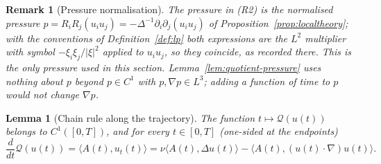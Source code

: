 \documentclass[11pt]{article}
\newtheorem{remark}[theorem]{Remark}
\newtheorem{lemma}[theorem]{Lemma}
\theoremstyle{definition}
\theoremstyle{plain}
\begin{document}
\begin{remark}[Pressure normalisation]\label{rem:qe-pressure-normalisation}
The pressure in (R2) is the normalised pressure
$p=R_iR_j(u_iu_j)=-\Delta^{-1}\partial_i\partial_j(u_iu_j)$ of
Proposition~\ref{prop:localtheory}; with the conventions of
Definition~\ref{def:lp} both expressions are the $L^2$ multiplier with
symbol $-\xi_i\xi_j/|\xi|^2$ applied to $u_iu_j$, so they coincide, as
recorded there.  This is the only pressure used in this section.
Lemma~\ref{lem:quotient-pressure} uses nothing about $p$ beyond $p\in C^1$
with $p,\nabla p\in L^3$; adding a function of time to $p$ would not change
$\nabla p$.
\end{remark}

\begin{lemma}[Chain rule along the trajectory]\label{lem:quotient-chainrule}
The function $t\mapsto\mathcal Q(u(t))$ belongs to $C^1([0,T])$, and for
every $t\in[0,T]$ (one-sided at the endpoints)
\begin{equation}\label{eq:qe-chainrule}
 \frac d{dt}\mathcal Q(u(t))
 =\langle A(t),u_t(t)\rangle
 =\nu\langle A(t),\Delta u(t)\rangle
 -\langle A(t),(u(t)\cdot\nabla)u(t)\rangle .
\end{equation}
\end{lemma}
\end{document}
